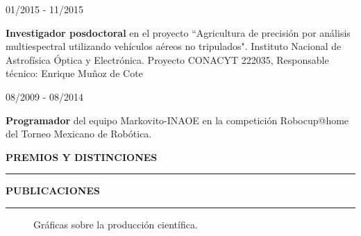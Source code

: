 \documentclass[10pt]{article}
\begin{document}
\begin{minipage}{1.5 in}
	01/2015 - 11/2015\\
\end{minipage}
\begin{minipage}{4.5in}
	\textbf{Investigador posdoctoral} en el proyecto ``Agricultura de precisión por análisis multiespectral
	utilizando vehículos aéreos no tripulados". Instituto Nacional de Astrofísica Óptica y Electrónica. Proyecto CONACYT 222035, Responsable técnico: Enrique Muñoz de Cote\\ 
\end{minipage}

\begin{minipage}{1.5 in}
08/2009 - 08/2014\\
\end{minipage}
\begin{minipage}{4.5in}
\textbf{Programador} del equipo Markovito-INAOE en la competición Robocup@home del Torneo Mexicano de Robótica.\\ 
\end{minipage}

{\bf PREMIOS Y DISTINCIONES}
\vspace{3pt}
\hrule
 

{\bf PUBLICACIONES}
\vspace{3pt}
\hrule

\begin{figure}[t]
	\hfill
	\caption{Gráficas sobre la producción científica.}
	\label{fig:dummy}
\end{figure}
\end{document}
